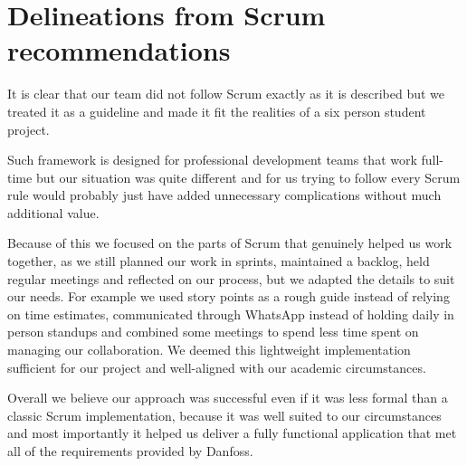 \section{Delineations from Scrum recommendations}

It is clear that our team did not follow Scrum exactly as it is described but we treated it as a guideline and made it fit the realities of a six person student project.

Such framework is designed for professional development teams that work full-time but our situation was quite different and for us trying to follow every Scrum rule would probably just have added unnecessary complications without much additional value.

Because of this we focused on the parts of Scrum that genuinely helped us work together, as we still planned our work in sprints, maintained a backlog, held regular meetings and reflected on our process, but we adapted the details to suit our needs. For example we used story points as a rough guide instead of relying on time estimates, communicated through WhatsApp instead of holding daily in person standups and combined some meetings to spend less time spent on managing our collaboration. We deemed this lightweight implementation sufficient for our project and well-aligned with our academic circumstances.

Overall we believe our approach was successful even if it was less formal than a classic Scrum implementation, because it was well suited to our circumstances and most importantly it helped us deliver a fully functional application that met all of the requirements provided by Danfoss.
